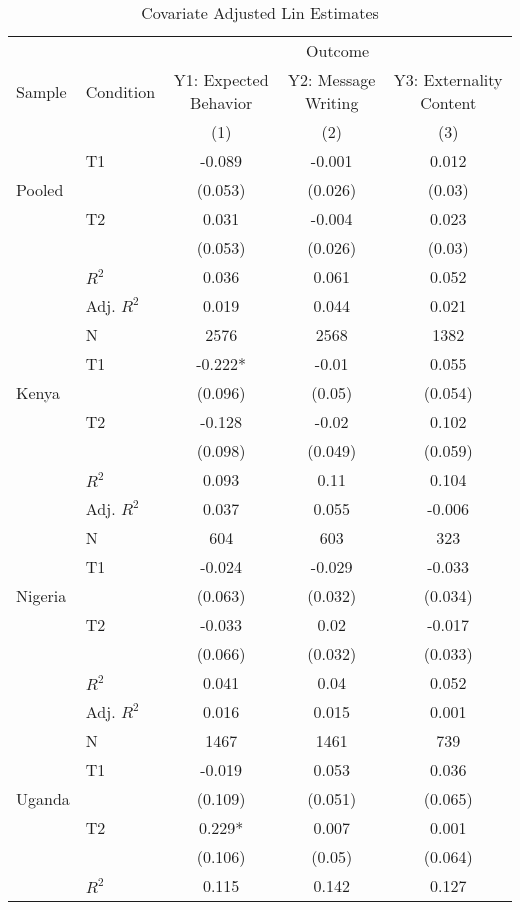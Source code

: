 \begin{table}[htb]
\centering \footnotesize
\caption{Covariate Adjusted Lin Estimates} 
\label{tab_lin_main}
\begin{tabular}{llccc}
\hline\hline && \multicolumn{3}{c}{Outcome} \\
Sample & Condition & Y1: Expected Behavior & Y2: Message Writing & Y3: Externality Content \\ 
& & (1) & (2) & (3) \\ \hline
 & T1 & -0.089 & -0.001 & 0.012 \\ 
  Pooled &  & (0.053) & (0.026) & (0.03) \\ 
   & T2 & 0.031 & -0.004 & 0.023 \\ 
   &  & (0.053) & (0.026) & (0.03) \\ \cline{2-5}
   & $R^2$ & 0.036 & 0.061 & 0.052 \\ 
   & Adj. $R^2$ & 0.019 & 0.044 & 0.021 \\ 
   & N & 2576 & 2568 & 1382 \\ \hline
   & T1 & -0.222* & -0.01 & 0.055 \\ 
  Kenya &  & (0.096) & (0.05) & (0.054) \\ 
   & T2 & -0.128 & -0.02 & 0.102 \\ 
   &  & (0.098) & (0.049) & (0.059) \\ \cline{2-5}
   & $R^2$ & 0.093 & 0.11 & 0.104 \\ 
   & Adj. $R^2$ & 0.037 & 0.055 & -0.006 \\ 
   & N & 604 & 603 & 323 \\ \hline
   & T1 & -0.024 & -0.029 & -0.033 \\ 
  Nigeria &  & (0.063) & (0.032) & (0.034) \\ 
   & T2 & -0.033 & 0.02 & -0.017 \\ 
   &  & (0.066) & (0.032) & (0.033) \\ \cline{2-5}
   & $R^2$ & 0.041 & 0.04 & 0.052 \\ 
   & Adj. $R^2$ & 0.016 & 0.015 & 0.001 \\ 
   & N & 1467 & 1461 & 739 \\ \hline
   & T1 & -0.019 & 0.053 & 0.036 \\ 
  Uganda &  & (0.109) & (0.051) & (0.065) \\ 
   & T2 & 0.229* & 0.007 & 0.001 \\ 
   &  & (0.106) & (0.05) & (0.064) \\ \cline{2-5}
   & $R^2$ & 0.115 & 0.142 & 0.127 \\ 

\end{tabular}
\end{table}
